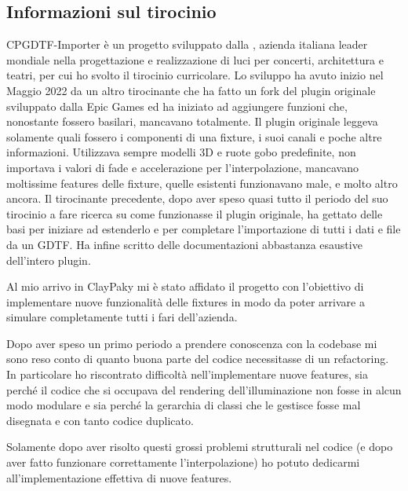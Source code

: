 \documentclass[main.tex]{subfiles}
\begin{document}
\subsection{Informazioni sul tirocinio}\label{subsec:1_tirocinio}
CPGDTF-Importer è un progetto sviluppato dalla , azienda italiana leader mondiale nella progettazione e realizzazione di luci per concerti, architettura e teatri, per cui ho svolto il tirocinio curricolare. Lo sviluppo ha avuto inizio nel Maggio 2022 da un altro tirocinante che ha fatto un fork del plugin originale sviluppato dalla Epic Games ed ha iniziato ad aggiungere funzioni che, nonostante fossero basilari, mancavano totalmente. Il plugin originale leggeva solamente quali fossero i componenti di una fixture, i suoi canali e poche altre informazioni. Utilizzava sempre modelli 3D e ruote gobo predefinite, non importava i valori di fade e accelerazione per l'interpolazione, mancavano moltissime features delle fixture, quelle esistenti funzionavano male, e molto altro ancora. Il tirocinante precedente, dopo aver speso quasi tutto il periodo del suo tirocinio a fare ricerca su come funzionasse il plugin originale, ha gettato delle basi per iniziare ad estenderlo e per completare l'importazione di tutti i dati e file da un GDTF. Ha infine scritto delle documentazioni abbastanza esaustive dell'intero plugin.\newline

Al mio arrivo in ClayPaky mi è stato affidato il progetto con l'obiettivo di implementare nuove funzionalità delle fixtures in modo da poter arrivare a simulare completamente tutti i fari dell'azienda.

Dopo aver speso un primo periodo a prendere conoscenza con la codebase mi sono reso conto di quanto buona parte del codice necessitasse di un refactoring. In particolare ho riscontrato difficoltà nell'implementare nuove features, sia perché il codice che si occupava del rendering dell'illuminazione non fosse in alcun modo modulare e sia perché la gerarchia di classi che le gestisce fosse mal disegnata e con tanto codice duplicato. 

Solamente dopo aver risolto questi grossi problemi strutturali nel codice (e dopo aver fatto funzionare correttamente l'interpolazione) ho potuto dedicarmi all'implementazione effettiva di nuove features. 

\end{document}
